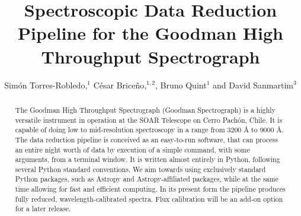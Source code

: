 \documentclass[11pt,twoside]{article}
\begin{document}
\title{Spectroscopic Data Reduction Pipeline for the Goodman High Throughput Spectrograph}

\author{Sim\'on Torres-Robledo,$^1$ C\'esar Brice\~no,$^{1, 2}$, Bruno Quint$^1$ and David Sanmartim$^3$
}


\begin{abstract}
The Goodman High Throughput Spectrograph (Goodman Spectrograph) is a highly
versatile instrument in operation at the SOAR Telescope on Cerro Pach\'on, Chile.
It is capable of doing low to mid-resolution spectroscopy in a range from 3200 \AA{}
to 9000 \AA{}. The data reduction pipeline is conceived as an easy-to-run software,
that can process an entire night worth of data by execution of a simple command,
with some arguments, from a terminal window. It is written almost entirely in
Python, following several Python standard conventions.
We aim towards using exclusively standard Python packages, such as Astropy and
Astropy-affiliated packages, while at the same time allowing for fast and
efficient computing.
In its present form the pipeline produces fully reduced, wavelength-calibrated
spectra. Flux calibration will be an add-on option for a later release.
\end{abstract}
\end{document}
